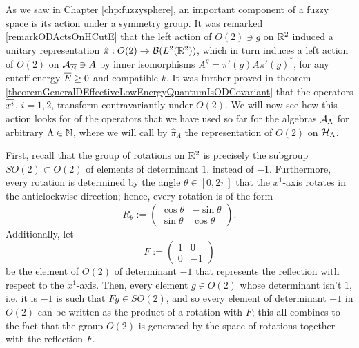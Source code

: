 \lin 

As we saw in Chapter \ref{chp:fuzzysphere}, an important component of a fuzzy space is its action under a symmetry group. It was remarked \ref{remarkODActsOnHCutE} that the left action of $O(2) \ni g$ on $\mathbb{R}^2$ induced a unitary representation $\hat \pi: O(2) \to \mathcal B(L^2(\mathbb{R}^2))$, which in turn induces a left action of $O(2)$ on $\mathcal A_{\overline{E}} \ni A$ by inner isomorphisms $A^g = \pi'(g) A \pi'(g)^*$, for any cutoff energy $\overline{E} \geq 0$ and compatible $k$. It was further proved in theorem \ref{theoremGeneralDEffectiveLowEnergyQuantumIsODCovariant} that the operators $\overline{x^i}$, $i = 1, 2$, transform contravariantly under $O(2)$. We will now see how this action looks for of the operators that we have used so far for the algebras $\mathcal A_\Lambda$ for arbitrary $\Lambda \in \mathbb{N}$, where we will call by $\hat \pi_\Lambda$ the representation of $O(2)$ on $\mathcal H_\Lambda$.%

First, recall that the group of rotations on $\mathbb{R}^2$ is precisely the subgroup $SO(2) \subset O(2)$ of elements of determinant $1$, instead of $-1$. Furthermore, every rotation is determined by the angle $\theta \in [0, 2\pi]$ that the $x^1$-axis rotates in the anticlockwise direction; hence, every rotation is of the form
\begin{equation}\label{equationGEneral2DRotationTheta}
    R_\theta := 
    \begin{pmatrix}
    \cos \theta & -\sin \theta \\
    \sin \theta & \cos \theta
    \end{pmatrix}.
\end{equation}
Additionally, let
\begin{equation}
    F := \begin{pmatrix}
    1 & 0 \\
    0 & -1
    \end{pmatrix}
\end{equation} be the element of $O(2)$ of determinant $-1$ that represents the reflection with respect to the $x^1$-axis. Then, every element $g \in O(2)$ whose determinant isn't $1$, i.e. it is $-1$ is such that $Fg \in SO(2)$, and so every element of determinant $-1$ in $O(2)$ can be written as the product of a rotation with $F$; this all combines to the fact that the group $O(2)$ is generated by the space of rotations together with the reflection $F$.

